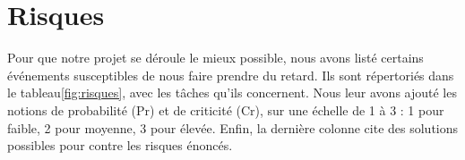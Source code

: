 \section{Risques}
	\label{sec:risques}


    Pour que notre projet se déroule le mieux possible, nous avons listé certains événements susceptibles de nous faire prendre du retard. Ils sont répertoriés dans le tableau\ref{fig:risques}, avec les tâches qu'ils concernent. Nous leur avons ajouté les notions de probabilité (Pr) et de criticité (Cr), sur une échelle de 1 à 3 : 1 pour faible, 2 pour moyenne, 3 pour élevée. Enfin, la dernière colonne cite des solutions possibles pour contre les risques énoncés.

